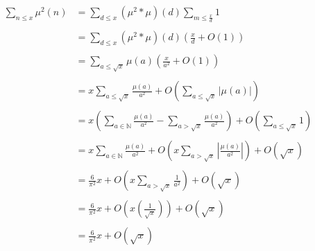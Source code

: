 \documentclass[12pt]{article}
\begin{document}
\begin{center}
$\begin{array}{ll}
\displaystyle \sum_{n \le x} \mu^2(n) & \displaystyle = \sum_{d \le x} (\mu^2*\mu)(d) \sum_{m \le \frac{x}{d}} 1 \\
& \\
& \displaystyle = \sum_{d \le x} (\mu^2*\mu)(d) \left( \frac{x}{d} + O(1) \right) \\
& \\
& \displaystyle = \sum_{a \le \sqrt{x}} \mu(a) \left( \frac{x}{a^2} + O(1) \right) \\
& \\
& \displaystyle = x \sum_{a \le \sqrt{x}} \frac{\mu(a)}{a^2} + O \left( \sum_{a \le \sqrt{x}} |\mu(a)| \right) \\
& \\
& \displaystyle = x \left( \sum_{a \in \mathbb{N}} \frac{\mu(a)}{a^2} - \sum_{a>\sqrt{x}} \frac{\mu(a)}{a^2} \right) + O \left( \sum_{a \le \sqrt{x}} 1 \right) \\
& \\
& \displaystyle = x \sum_{a \in \mathbb{N}} \frac{\mu(a)}{a^2} + O \left( x \sum_{a>\sqrt{x}} \left| \frac{\mu(a)}{a^2} \right| \right) + O(\sqrt{x}) \\
& \\
& \displaystyle = \frac{6}{\pi^2}x + O \left( x \sum_{a>\sqrt{x}} \frac{1}{a^2} \right) + O(\sqrt{x}) \\
& \\
& \displaystyle = \frac{6}{\pi^2}x + O \left( x \left( \frac{1}{\sqrt{x}} \right) \right) + O(\sqrt{x}) \\
& \\
& \displaystyle = \frac{6}{\pi^2}x + O(\sqrt{x}) \end{array}$
\end{center}
\end{document}
